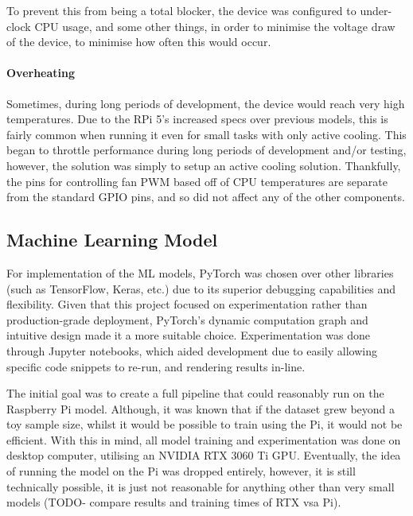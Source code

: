                     To prevent this from being a total blocker, the device was configured to under-clock CPU usage, and some other things, in order to minimise the voltage draw of the device, to minimise how often this would occur.
    
                \paragraph{Overheating}
    
                    Sometimes, during long periods of development, the device would reach very high temperatures. Due to the RPi 5's increased specs over previous models, this is fairly common when running it even for small tasks with only active cooling. This began to throttle performance during long periods of development and/or testing, however, the solution was simply to setup an active cooling solution. Thankfully, the pins for controlling fan PWM based off of CPU temperatures are separate from the standard GPIO pins, and so did not affect any of the other components.
    
      \subsection{Machine Learning Model} \label{sec:mlImp}
    
            For implementation of the ML models, PyTorch was chosen over other libraries (such as TensorFlow, Keras, etc.) due to its superior debugging capabilities and flexibility. Given that this project focused on experimentation rather than production-grade deployment, PyTorch's dynamic computation graph and intuitive design made it a more suitable choice. Experimentation was done through Jupyter notebooks, which aided development due to easily allowing specific code snippets to re-run, and rendering results in-line.
    
            The initial goal was to create a full pipeline that could reasonably run on the Raspberry Pi model. Although, it was known that if the dataset grew beyond a toy sample size, whilst it would be possible to train using the Pi, it would not be efficient. With this in mind, all model training and experimentation was done on desktop computer, utilising an NVIDIA RTX 3060 Ti GPU. Eventually, the idea of running the model on the Pi was dropped entirely, however, it is still technically possible, it is just not reasonable for anything other than very small models (TODO- compare results and training times of RTX vsa Pi).
    
